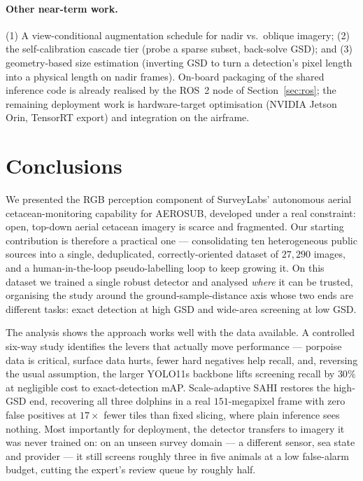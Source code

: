 \documentclass[11pt,a4paper]{article}
\newcommand{\map}{mAP}
\begin{document}
\paragraph{Other near-term work.}
(1) A view-conditional augmentation schedule for nadir vs.\ oblique imagery;
(2) the self-calibration cascade tier (probe a sparse subset, back-solve GSD);
and (3) geometry-based size estimation (inverting GSD to turn a detection's pixel
length into a physical length on nadir frames). On-board packaging of the shared
inference code is already realised by the ROS~2 node of Section~\ref{sec:ros};
the remaining deployment work is hardware-target optimisation (NVIDIA Jetson
Orin, TensorRT export) and integration on the airframe.

\section{Conclusions}
We presented the RGB perception component of SurveyLabs' autonomous aerial
cetacean-monitoring capability for AEROSUB, developed under a real constraint:
open, top-down aerial cetacean imagery is scarce and fragmented. Our starting
contribution is therefore a practical one --- consolidating ten heterogeneous
public sources into a single, deduplicated, correctly-oriented dataset of
$27{,}290$ images, and a human-in-the-loop pseudo-labelling loop to keep growing
it. On this dataset we trained a single robust detector and analysed \emph{where}
it can be trusted, organising the study around the ground-sample-distance axis
whose two ends are different tasks: exact detection at high GSD and wide-area
screening at low GSD.

The analysis shows the approach works well with the data available. A controlled
six-way study identifies the levers that actually move performance --- porpoise
data is critical, surface data hurts, fewer hard negatives help recall, and,
reversing the usual assumption, the larger YOLO11s backbone lifts screening
recall by $30\%$ at negligible cost to exact-detection \map. Scale-adaptive SAHI
restores the high-GSD end, recovering all three dolphins in a real
$151$-megapixel frame with zero false positives at $17\times$ fewer tiles than
fixed slicing, where plain inference sees nothing. Most importantly for
deployment, the detector transfers to imagery it was never trained on: on an
unseen survey domain --- a different sensor, sea state and provider --- it still
screens roughly three in five animals at a low false-alarm budget, cutting the
expert's review queue by roughly half.
\end{document}
